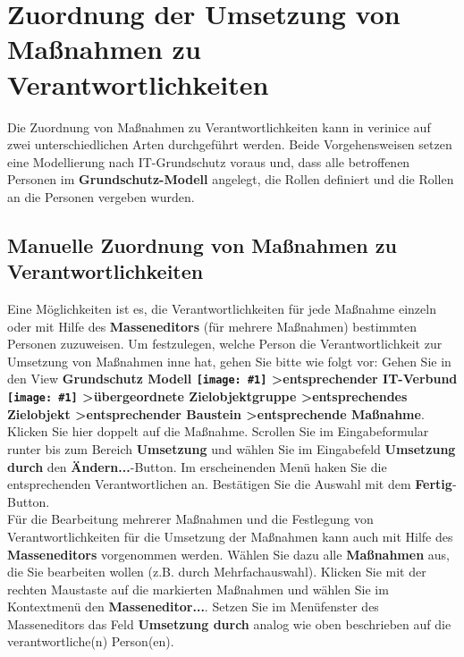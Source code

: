 \documentclass[a4paper,10pt]{book}
\newcommand{\icon}[1]{\texttt{[image: \#1]}}
\begin{document}
\section{Zuordnung der Umsetzung von Maßnahmen zu Verantwortlichkeiten}
Die Zuordnung von Maßnahmen zu Verantwortlichkeiten kann in verinice auf zwei unterschiedlichen Arten durchgeführt werden. Beide Vorgehensweisen setzen eine Modellierung nach IT-Grundschutz voraus und, dass alle betroffenen Personen im \textbf{Grundschutz-Modell} angelegt, die Rollen definiert und die Rollen an die Personen vergeben wurden.

\subsection{Manuelle Zuordnung von Maßnahmen zu Verantwortlichkeiten}
Eine Möglichkeiten ist es, die Verantwortlichkeiten für jede Maßnahme einzeln oder mit Hilfe des \textbf{Masseneditors} (für mehrere Maßnahmen) bestimmten Personen zuzuweisen. Um festzulegen, welche Person die Verantwortlichkeit zur Umsetzung von Maßnahmen inne hat, gehen Sie bitte wie folgt vor: Gehen Sie in den View \textbf{Grundschutz Modell \icon{Icon/GS_Modell.png} \textgreater entsprechender IT-Verbund \icon{Icon/GS_Modell.png} \textgreater übergeordnete Zielobjektgruppe \textgreater entsprechendes Zielobjekt \textgreater entsprechender Baustein \textgreater entsprechende Maßnahme}. Klicken Sie hier doppelt auf die Maßnahme. Scrollen Sie im Eingabeformular runter bis zum Bereich \textbf{Umsetzung} und wählen Sie im Eingabefeld \textbf{Umsetzung durch} den \textbf{Ändern...}-Button. Im erscheinenden Menü haken Sie die entsprechenden Verantwortlichen an. Bestätigen Sie die Auswahl mit dem \textbf{Fertig}-Button.
\newline\\
Für die Bearbeitung mehrerer Maßnahmen und die Festlegung von Verantwortlichkeiten für die Umsetzung der Maßnahmen kann auch mit Hilfe des \textbf{Masseneditors} vorgenommen werden. Wählen Sie dazu alle \textbf{Maßnahmen} aus, die Sie bearbeiten wollen (z.B. durch Mehrfachauswahl). Klicken Sie mit der rechten Maustaste auf die markierten Maßnahmen und wählen Sie im Kontextmenü den \textbf{Masseneditor...}. Setzen Sie im Menüfenster des Masseneditors das Feld \textbf{Umsetzung durch} analog wie oben beschrieben auf die verantwortliche(n) Person(en).
\end{document}
